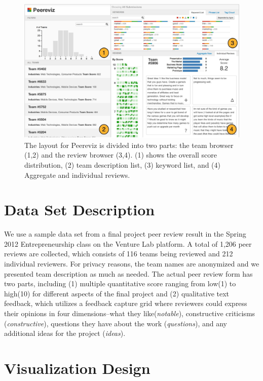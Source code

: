 \documentclass{sigchi}
\begin{document}
\begin{figure}[!t]
\centering
\includegraphics[width=2.0\columnwidth]{images/overview-annotated}
\caption{The layout for Peereviz is divided into two parts:
the team browser (1,2) and the review browser (3,4).
(1) shows the overall score distribution,
(2) team description list,
(3) keyword list, and
(4) Aggregate and individual reviews.}
\label{fig:overview-annotated}
\end{figure}

\section{Data Set Description}
We use a sample data set from a final project peer review result in the Spring
2012 Entrepreneurship class on the Venture Lab platform. A total of 1,206 peer
reviews are collected, which consists of 116 teams being reviewed and 212
individual reviewers. For privacy reasons, the team names are anonymized and we
presented team description as much as needed. The actual peer review form has
two parts, including (1) multiple quantitative score ranging from low(1) to
high(10) for different aspects of the final project and (2) qualitative text
feedback, which utilizes a feedback capture grid \cite{dbootcamp} where
reviewers could express their opinions in four dimensions–what they
like(\emph{notable}), constructive criticisms (\emph{constructive}), questions
they have about the work (\emph{questions}), and any additional ideas for the
project (\emph{ideas}).



\section{Visualization Design}
\end{document}
